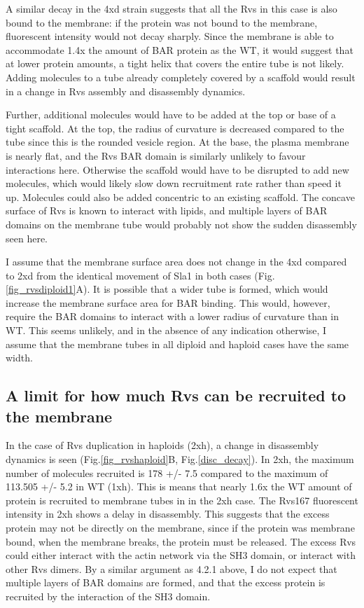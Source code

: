 	\vspace{5mm}
A similar decay in the 4xd strain suggests that all the Rvs in this case is also bound to the membrane: if the protein was not bound to the membrane, fluorescent intensity would not decay sharply. Since the membrane is able to accommodate 1.4x the amount of BAR protein as the WT, it would suggest that at lower protein amounts, a tight helix that covers the entire tube is not likely. Adding molecules to a tube already completely covered by a scaffold would result in a change in Rvs assembly and disassembly dynamics. 

Further, additional molecules would have to be added at the top or base of a tight scaffold. At the top, the radius of curvature is decreased compared to the tube since this is the rounded vesicle region. At the base, the plasma membrane is nearly flat, and the Rvs BAR domain is similarly unlikely to favour interactions here. Otherwise the scaffold would have to be disrupted to add new molecules, which would likely slow down recruitment rate rather than speed it up. Molecules could also be added concentric to an existing scaffold. The concave surface of Rvs is known to interact with lipids, and multiple layers of BAR domains on the membrane tube would probably not show the sudden disassembly seen here.  

I assume that the membrane surface area does not change in the 4xd compared to 2xd from the identical movement of Sla1 in both cases (Fig.\ref{fig_rvsdiploid1}A). It is possible that a wider tube is formed, which would increase the membrane surface area for BAR binding. This would, however, require the BAR domains to interact with a lower radius of curvature than in WT. This seems unlikely, and in the absence of any indication otherwise, I assume that the membrane tubes in all diploid and haploid cases have the same width.


\subsection{A limit for how much Rvs can be recruited to the membrane}
In the case of Rvs duplication in haploids (2xh), a change in disassembly dynamics is seen (Fig.\ref{fig_rvshaploid}B, Fig.\ref{disc_decay}). In 2xh, the maximum number of molecules recruited is 178 +/- 7.5 compared to the maximum of 113.505 +/- 5.2 in WT (1xh). This is means that nearly 1.6x the WT amount of protein is recruited to membrane tubes in in the 2xh case. The Rvs167 fluorescent intensity in 2xh shows a delay in disassembly. This suggests that the excess protein may not be directly on the membrane, since if the protein was membrane bound, when the membrane breaks, the protein must be released. The excess Rvs could either interact with the actin network via the SH3 domain, or interact with other Rvs dimers. By a similar argument as 4.2.1 above, I do not expect that multiple layers of BAR domains are formed, and that the excess protein is recruited by the interaction of the SH3 domain. 


